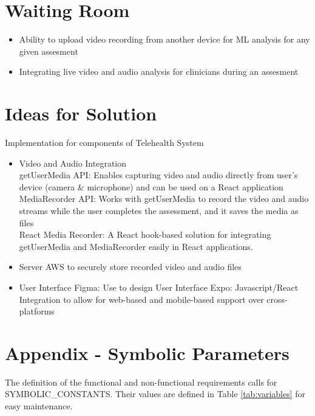 \documentclass[12pt]{article}
\begin{document}
\section{Waiting Room}
\begin{itemize}
  \item Ability to upload video recording from another device for ML analysis for any given assesment
  \item Integrating live video and audio analysis for clinicians during an assesment
\end{itemize}

\newpage

\section{Ideas for Solution}

Implementation for components of Telehealth System 

\begin{itemize}
\item Video and Audio Integration \\
\subitem getUserMedia API: Enables capturing video and audio directly from user's device (camera \& microphone) and can be used on a React application \\
\subitem MediaRecorder API: Works with getUserMedia to record the video and audio streams while the user completes the assessment, and it saves the media as files \\
\subitem React Media Recorder: A React hook-based solution for integrating getUserMedia and MediaRecorder easily in React applications.\\
\item Server
\subitem AWS to securely store recorded video and audio files 
\item User Interface 
\subitem Figma: Use to design User Interface 
\subitem Expo: Javascript/React Integration to allow for web-based and mobile-based support over cross-platforms
\end{itemize}

\newpage

\section*{Appendix - Symbolic Parameters}

The definition of the functional and non-functional requirements calls for SYMBOLIC\_CONSTANTS.
Their values are defined in Table \ref{tab:variables} for easy maintenance.
\end{document}
